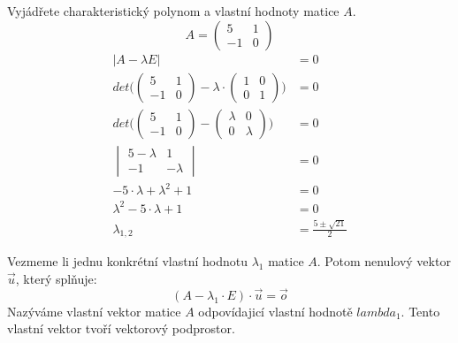 \begin{example}
    Vyjádřete charakteristický polynom a vlastní hodnoty matice $A$.
    \[A=
    \begin{pmatrix}
        5 & 1\\
        -1 & 0
    \end{pmatrix}
    \]
    \begin{align*}
        |A - \lambda E| &= 0\\
        det \Bigg(
        \begin{pmatrix}
            5 & 1\\
            -1 & 0
        \end{pmatrix} - \lambda \cdot
        \begin{pmatrix}
            1 & 0\\
            0 & 1
        \end{pmatrix} \Bigg ) &= 0 \\
        det \Bigg(
        \begin{pmatrix}
            5 & 1\\
            -1 & 0
        \end{pmatrix} -
        \begin{pmatrix}
            \lambda & 0\\
            0 & \lambda
        \end{pmatrix} \Bigg ) &= 0 \\
        \begin{vmatrix}
            5 - \lambda & 1\\
            -1 & - \lambda
        \end{vmatrix} &= 0 \\
        -5 \cdot \lambda + \lambda^2 + 1 &= 0\\
        \lambda^2 -5 \cdot \lambda + 1 &= 0\\
        \lambda_{1,2} &= \frac{5 \pm \sqrt{21}}{2}
    \end{align*}
\end{example}

\begin{definition}
    Vezmeme li jednu konkrétní vlastní hodnotu $\lambda_1$ matice $A$.
    Potom nenulový vektor $\vec{u}$, který splňuje:
    $$(A - \lambda_1 \cdot E) \cdot \vec{u} = \vec{o}$$
    Nazýváme vlastní vektor matice $A$ odpovídajicí vlastní hodnotě $lambda_1$.
    Tento vlastní vektor tvoří vektorový podprostor.
\end{definition}

